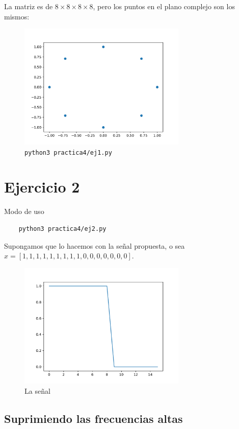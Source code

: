 \documentclass[11pt, spanish]{article}
\begin{document}
La matriz es de $8\times 8\times 8\times 8$, pero los puntos en el plano complejo son los mismos:

\begin{figure}[H]
\centering
  \includegraphics[height=6cm]{informe-imgs/ej1.pdf}
  \caption{\texttt{python3 practica4/ej1.py}}
\end{figure}

\newpage
\section{Ejercicio 2}
Modo de uso
\begin{verbatim}
    python3 practica4/ej2.py
\end{verbatim}

Supongamos que lo hacemos con la señal propuesta, o sea $x = [1, 1, 1, 1, 1, 1, 1, 1, 1, 0, 0, 0, 0, 0, 0, 0]$.

\begin{figure}[H]
\centering
  \includegraphics[height=6cm]{informe-imgs/ej2-senial.pdf}
  \caption{La señal}
\end{figure}

\subsection{Suprimiendo las frecuencias altas}
\end{document}
